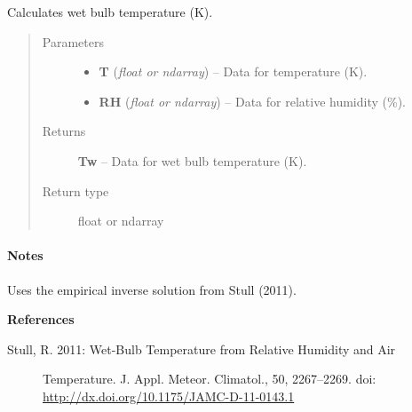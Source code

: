 \documentclass[letterpaper,10pt,english]{sphinxmanual}
\begin{document}
\begin{fulllineitems}
\label{atmos:atmos.equations.Tw_from_T_RH_Stull}
Calculates wet bulb temperature (K).
\begin{quote}\begin{description}
\item[{Parameters}] \leavevmode\begin{itemize}
\item {} 
\textbf{T} (\emph{float or ndarray}) -- Data for temperature (K).

\item {} 
\textbf{RH} (\emph{float or ndarray}) -- Data for relative humidity (\%).

\end{itemize}

\item[{Returns}] \leavevmode
\textbf{Tw} --
Data for wet bulb temperature (K).

\item[{Return type}] \leavevmode
float or ndarray

\end{description}\end{quote}
\paragraph{Notes}

Uses the empirical inverse solution from Stull (2011).

\textbf{References}
\begin{description}
\item[{Stull, R. 2011: Wet-Bulb Temperature from Relative Humidity and Air}] \leavevmode
Temperature. J. Appl. Meteor. Climatol., 50, 2267–2269.
doi: \href{http://dx.doi.org/10.1175/JAMC-D-11-0143.1}{http://dx.doi.org/10.1175/JAMC-D-11-0143.1}

\end{description}

\end{fulllineitems}


\begin{fulllineitems}
\label{atmos:atmos.equations.autodoc}
\end{fulllineitems}
\end{document}
